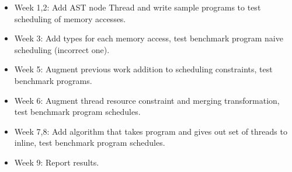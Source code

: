 \documentclass[sigplan,10pt,review]{acmart}
\begin{document}
        \begin{itemize}
            \item Week 1,2: Add AST node Thread and write sample programs to test scheduling of memory accesses.
            \item Week 3: Add types for each memory access, test benchmark program naive scheduling (incorrect one).
            \item Week 5: Augment previous work addition to scheduling constraints, test benchmark programs. 
            \item Week 6: Augment thread resource constraint and merging transformation, test benchmark program schedules.
            \item Week 7,8: Add algorithm that takes program and gives out set of threads to inline, test benchmark program schedules.
            \item Week 9: Report results.
        \end{itemize}


    
    
\end{document}
